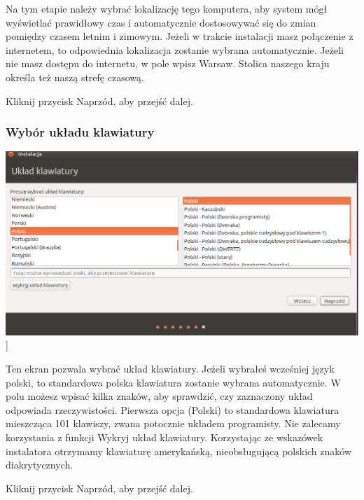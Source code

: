 Na tym etapie należy wybrać lokalizację tego komputera, aby system mógł wyświetlać prawidłowy czas i automatycznie dostosowywać się do zmian pomiędzy czasem letnim i zimowym. Jeżeli w trakcie instalacji masz połączenie z internetem, to odpowiednia lokalizacja zostanie wybrana automatycznie. Jeżeli nie masz dostępu do internetu, w pole wpisz \textcolor{ubuntu_orange}{Warsaw}. Stolica naszego kraju określa też naszą strefę czasową.
\begin{flushright}
Kliknij przycisk \textcolor{ubuntu_orange}{Naprzód}, aby przejść dalej.
\end{flushright}
\clearpage
\subsubsection{Wybór układu klawiatury}
\begin{center}
        \includegraphics[width=\linewidth]{images/instalator_klawiatura.png}]
\end{center}

Ten ekran pozwala wybrać układ klawiatury. Jeżeli wybrałeś wcześniej język polski, to standardowa polska klawiatura zostanie wybrana automatycznie. W polu możesz wpisać kilka znaków, aby sprawdzić, czy zaznaczony układ odpowiada rzeczywistości. Pierwsza opcja (\textcolor{ubuntu_orange}{Polski}) to standardowa klawiatura mieszcząca 101 klawiszy, zwana potocznie układem programisty.
Nie zalecamy korzystania z funkcji \textcolor{ubuntu_orange}{Wykryj układ klawiatury}. Korzystając ze wskazówek instalatora otrzymamy klawiaturę amerykańską, nieobsługującą polskich znaków diakrytycznych.
\begin{flushright}
Kliknij przycisk \textcolor{ubuntu_orange}{Naprzód}, aby przejść dalej.
\end{flushright}
\clearpage
